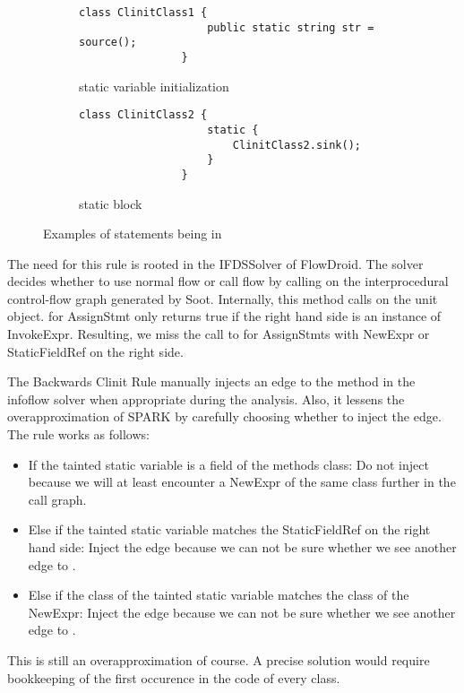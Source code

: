 \documentclass[../draft.tex]{subfiles}
\begin{document}
    \begin{figure}[ht]
        \centering
        \begin{subfigure}[b]{0.45\textwidth}
            \centering
            \begin{lstlisting}[gobble=16]
                class ClinitClass1 {
                    public static string str = source();
                }
            \end{lstlisting}
            \caption{static variable initialization}
            \label{lst:clinit_examples_a}
        \end{subfigure}
        \hfill
        \begin{subfigure}[b]{0.45\textwidth}
            \centering
            \begin{lstlisting}[gobble=16]
                class ClinitClass2 {
                    static {
                        ClinitClass2.sink();
                    }
                }
            \end{lstlisting}
            \caption{static block}
            \label{lst:clinit_examples_b}
        \end{subfigure}
        \caption{Examples of statements being in }
        \label{lst:clinit_examples}
    \end{figure}


    The need for this rule is rooted in the IFDSSolver of FlowDroid. The solver decides whether to use normal flow or call flow by calling  on the interprocedural control-flow graph generated by Soot. Internally, this method calls  on the unit object.  for AssignStmt only returns true if the right hand side is an instance of InvokeExpr. Resulting, we miss the call to  for AssignStmts with NewExpr or StaticFieldRef on the right side.

    The Backwards Clinit Rule manually injects an edge to the  method in the infoflow solver when appropriate during the analysis. Also, it lessens the overapproximation of SPARK by carefully choosing whether to inject the edge. The rule works as follows:
    \begin{itemize}
        \item If the tainted static variable is a field of the methods class: Do not inject because we will at least encounter a NewExpr of the same class further in the call graph.
        \item Else if the tainted static variable matches the StaticFieldRef on the right hand side: Inject the edge because we can not be sure whether we see another edge to .
        \item Else if the class of the tainted static variable matches the class of the NewExpr: Inject the edge because we can not be sure whether we see another edge to .
    \end{itemize}
    This is still an overapproximation of course. A precise solution would require bookkeeping of the first occurence in the code of every class. 
\end{document}
